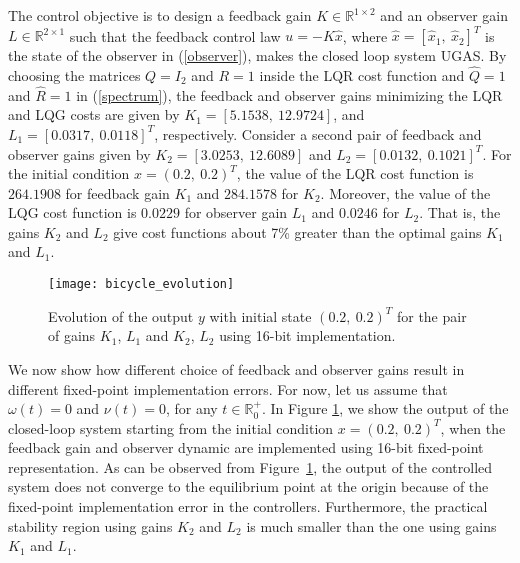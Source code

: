 \documentclass{amsart}
\numberwithin{equation}{section}
\newcommand{\R}{{\mathbb{R}}}
\begin{document}
The control objective is to design a feedback gain $K\in\R^{1\times2}$ and an observer gain $L\in\R^{2\times{1}}$ such that the feedback control law $u=-K\widehat{x}$, 
where \mbox{$\widehat{x}=[\widehat{x}_1,~\widehat{x}_2]^T$} is the state of the observer in (\ref{observer}), 
makes the closed loop system UGAS. 
By choosing the matrices $Q=I_2$ and $R=1$ inside the LQR cost function and $\widehat{Q}=1$ and $\widehat{R}=1$ in (\ref{spectrum}), 
the feedback and observer gains minimizing the LQR and LQG costs are given by $K_1=[5.1538,~12.9724]$, and $L_1=[0.0317,~0.0118]^T$, respectively. 
Consider a second pair of feedback and observer gains given by $K_2=[3.0253,~12.6089]$ and $L_2=[0.0132,~0.1021]^T$. 
For the initial condition $x=(0.2,~0.2)^T$, the value of the LQR cost function is $264.1908$ for feedback gain $K_1$ and 
$284.1578$ for $K_2$. 
Moreover, the value of the LQG cost function is $0.0229$ for observer gain $L_1$ and $0.0246$ for $L_2$. 
That is, the gains $K_2$ and $L_2$ give cost functions about 7\% greater than the optimal gains $K_1$ and $L_1$.

\begin{figure}
  \centering\texttt{[image: bicycle\_evolution]}
  \caption{Evolution of the output $y$ with initial state $(0.2,~0.2)^T$ for the pair of gains $K_1$, $L_1$ and $K_2$, $L_2$ using 16-bit implementation.}
\label{fig1}
\end{figure}

We now show how different choice of feedback and observer gains result in different fixed-point implementation errors.
For now, let us assume that $\omega(t)=0$ and $\nu(t)=0$, for any $t\in\R_0^+$. 
In Figure \ref{fig1}, we show the output of the closed-loop system starting from the 
initial condition $x = (0.2,~0.2)^T$, 
when the feedback gain and observer dynamic are implemented using 16-bit fixed-point representation. 
As can be observed from Figure~\ref{fig1}, 
the output of the controlled system 
does not converge to the equilibrium point at the origin because 
of the fixed-point implementation error in the controllers. Furthermore, the practical stability region using gains $K_2$ and $L_2$ is much smaller than the one using gains $K_1$ and $L_1$.
\end{document}
